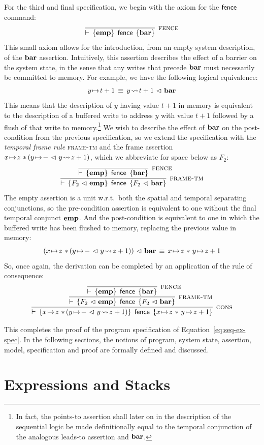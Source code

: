 \documentclass[11pt]{report}         %
\begin{document}
For the third and final specification, we begin with the axiom for the $\operatorname{\mathsf{fence}}$ command: \[ \infer[\textsc{fence}]{\triple{\femp}{\cfence}{\fbaru}}{}\] This small axiom allows for the introduction, from an empty system description, of the $\mathbf{bar}$ assertion. Intuitively, this assertion describes the effect of a barrier on the system state, in the sense that any writes that precede $\mathbf{bar}$ must necessarily be committed to memory. For example, we have the following logical equivalence: \[ y \!\mapsto\! t+1 \,\equiv\, y \!\leadsto\! t+1 \operatorname{\,\vartriangleleft\,} \mathbf{bar} \] This means that the description of $y$ having value $t+1$ in memory is equivalent to the description of a buffered write to address $y$ with value $t+1$ followed by a flush of that write to memory.\footnote{In fact, the points-to assertion shall later on in the description of the sequential logic be made definitionally equal to the temporal conjunction of the analogous leads-to assertion and $\mathbf{bar}$.} We wish to describe the effect of $\mathbf{bar}$ on the post-condition from the previous specification, so we extend the specification with the \emph{temporal frame rule} \textsc{frame-tm} and the frame assertion $x \!\mapsto\! z \operatorname{\,\ast\,} (y \!\mapsto\! - \operatorname{\,\vartriangleleft\,} y \!\leadsto\! z+1)$, which we abbreviate for space below as $F_2$: 
\[ \infer[\textsc{frame-tm}]{\triple{F_2 \fseq \femp}{\cfence}{F_2 \fseq \fbaru}}{
\infer[\textsc{fence}]{\triple{\femp}{\cfence}{\fbaru}}{}}\] The empty assertion is a unit w.r.t.\ both the spatial and temporal separating conjunctions, so the pre-condition assertion is equivalent to one without the final temporal conjunct $\mathbf{emp}$. And the post-condition is equivalent to one in which the buffered write has been flushed to memory, replacing the previous value in memory: \[ (x \fpointsto z \fsep (y \fpointsto - \fseq y \fwriteu z+1)) \fseq \fbaru \sequiv x \fpointsto z \fsep y \fpointsto z+1\] So, once again, the derivation can be completed by an application of the rule of consequence: \[ \infer[\textsc{cons}]{\triple{x \fpointsto z \fsep (y \fpointsto - \fseq y \fwriteu z+1)}{\cfence}{x \fpointsto z \fsep y \fpointsto z+1}}{\infer[\textsc{frame-tm}]{\triple{F_2 \fseq \femp}{\cfence}{F_2 \fseq \fbaru}}{
\infer[\textsc{fence}]{\triple{\femp}{\cfence}{\fbaru}}{}}}\]

This completes the proof of the program specification of Equation~\ref{eq:seq-ex-spec}. In the following sections, the notions of program, system state, assertion, model, specification and proof are formally defined and discussed.

\section{Expressions and Stacks}
\label{sec:expressions}
\end{document}
